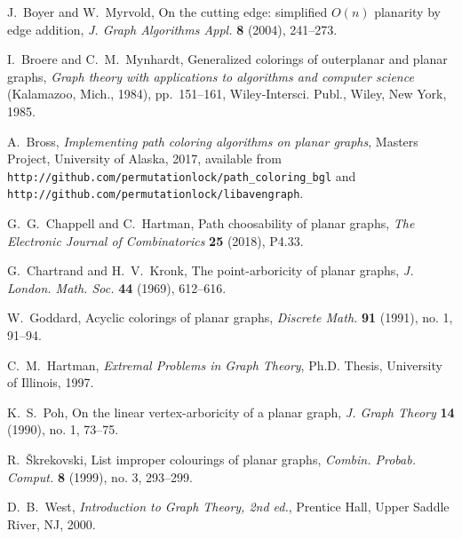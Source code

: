 \documentclass[12pt,letterpaper]{article}
\theoremstyle{plain}
\theoremstyle{definition}
\theoremstyle{break}
\begin{document}
\begin{thebibliography}{99}

J.~Boyer and W.~Myrvold, On the cutting edge: simplified $O(n)$ planarity by edge
addition,
\textit{J. Graph Algorithms Appl.}
\textbf{8} (2004),
241--273.

I.~Broere and C.~M.~Mynhardt,
Generalized colorings of outerplanar and planar graphs,
\textit{Graph theory with applications to algorithms and computer science}
 (Kalamazoo, Mich., 1984),
pp.~151--161,
Wiley-Intersci. Publ., Wiley, New York, 1985.

A.~Bross,
\textit{Implementing path coloring algorithms on planar graphs},
Masters Project,
University of Alaska,
2017,
available from\hfil\break
\texttt{http://github.com/permutationlock/path\_coloring\_bgl} and\hfil\break
\texttt{http://github.com/permutationlock/libavengraph}.

G.~G.~Chappell and C.~Hartman,
Path choosability of planar graphs,
\textit{The Electronic Journal of Combinatorics} \textbf{25} (2018),
P4.33.

G.~Chartrand and H.~V.~Kronk,
The point-arboricity of planar graphs,
\textit{J. London. Math. Soc.}
\textbf{44} (1969),
612--616.

W.~Goddard,
Acyclic colorings of planar graphs,
\textit{Discrete Math.}
\textbf{91} (1991), no. 1,
91--94.

C.~M.~Hartman,
\textit{Extremal Problems in Graph Theory},
Ph.D. Thesis,
University of Illinois,
1997.

K.~S.~Poh,
On the linear vertex-arboricity of a planar graph,
\textit{J. Graph Theory}
\textbf{14} (1990), no. 1,
73--75.

R.~\v{S}krekovski,
List improper colourings of planar graphs,
\textit{Combin. Probab. Comput.}
\textbf{8} (1999), no. 3,
293--299.

D.~B.~West,
\textit{Introduction to Graph Theory, 2nd ed.},
Prentice Hall,
Upper Saddle River, NJ,
2000.

\end{thebibliography}
\end{document}
